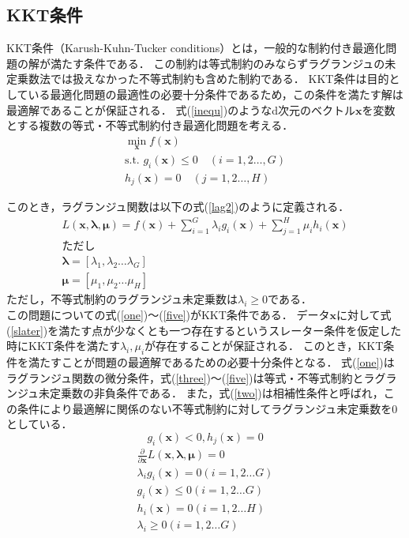 \documentclass[11pt,a4paper,titlepage]{ltjsarticle}
\begin{document}
\subsection{KKT条件}
KKT条件（Karush-Kuhn-Tucker conditions）とは，一般的な制約付き最適化問題の解が満たす条件である．
この制約は等式制約のみならずラグランジュの未定乗数法では扱えなかった不等式制約も含めた制約である．
KKT条件は目的としている最適化問題の最適性の必要十分条件であるため，この条件を満たす解は最適解であることが保証される．
式(\ref{inequ})のようなd次元のベクトル$\bm{x}$を変数とする複数の等式・不等式制約付き最適化問題を考える．
\begin{equation}
    \label{inequ}
    \begin{gathered}
        \underset{\bm{x}}{\min} f(\bm{x}) \\
        \text{s.t. } g_i(\bm{x}) \leq 0 \quad (i = 1,2\dots,G) \\
        h_j(\bm{x}) = 0 \quad (j = 1,2\dots,H)
    \end{gathered}
\end{equation}


このとき，ラグランジュ関数は以下の式(\ref{lag2})のように定義される．
\begin{equation}
    \label{lag2}
    \begin{gathered}
        L(\bm{x}, \bm{\lambda}, \bm{\mu}) = f(\bm{x}) + \sum_{i = 1}^{G}\lambda_i g_i(\bm{x}) + \sum_{j = 1}^{H} \mu_i h_i(\bm{x})\\
        ただし\\
        \bm{\lambda} = [\lambda_1,\lambda_2\dots\lambda_G]\\
        \bm{\mu} = [\mu_1,\mu_2\dots\mu_H]
    \end{gathered}
\end{equation}
ただし，不等式制約のラグランジュ未定乗数は$\lambda_i \geq 0$である．\\
この問題についての式(\ref{one})～(\ref{five})がKKT条件である．
データ$\bm{x}$に対して式(\ref{slater})を満たす点が少なくとも一つ存在するというスレーター条件を仮定した時にKKT条件を満たす$\lambda_i,\mu_i$が存在することが保証される．
このとき，KKT条件を満たすことが問題の最適解であるための必要十分条件となる．
式(\ref{one})はラグランジュ関数の微分条件，式(\ref{three})～(\ref{five})は等式・不等式制約とラグランジュ未定乗数の非負条件である．
また，式(\ref{two})は相補性条件と呼ばれ\cite{kkt-condition}，この条件により最適解に関係のない不等式制約に対してラグランジュ未定乗数を0としている．
\begin{equation}
    \label{slater}
    g_i(\bm{x})<0,h_j(\bm{x})=0
\end{equation}
\begin{align}
        \frac{\partial }{\partial \bm{x}}L(\bm{x},\bm{\lambda},\bm{\mu}) = 0 \label{one}\\
        \lambda_i g_i(\bm{x}) = 0  (i = 1,2\dots G) \label{two}\\
        g_i(\bm{x}) \leq 0 (i = 1,2\dots G)\label{three}\\
        h_i(\bm{x}) = 0 (i = 1,2\dots H)\label{four}\\
        \lambda_i \geq 0 (i = 1,2\dots G)\label{five}
\end{align}
\clearpage
\end{document}
